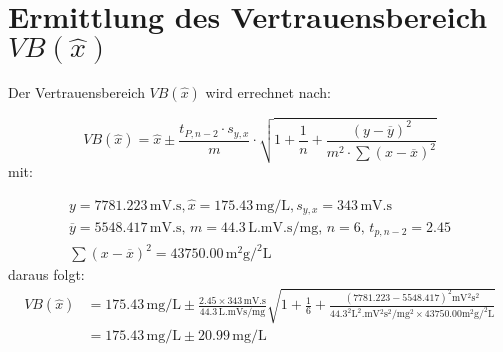 \documentclass{article}
\begin{document}
\section{Ermittlung des Vertrauensbereich $ VB(\hat{x}) $}
\begin{flushleft}
  Der Vertrauensbereich $VB(\hat{x})$ wird errechnet nach:
\end{flushleft}
\begin{equation}
  VB(\hat{x}) = \hat{x} \pm \frac{t_{P,n-2} \cdot s _{y,x}}{m} \cdot \sqrt{1+\frac{1}{n}+\frac{(y-\overline{y})^2}{m^2 \cdot \sum (x -\overline{x})^2}}
\end{equation}
mit:\par\noindent
\begin{align*}
   y =  \num{7781.223} \, \si{\milli\volt.\second} ,
   \hat{x}  = 175.43 \, \si{\milli\gram\per\liter} ,
   s_{y,x} = 343 \, \si{\milli\volt.\second} \\
    \overline{y} = \num{5548.417} \, \si{\milli\volt.\second} ,
   \, m = 44.3 \, \si{\liter.\milli\volt.\second\per\milli\gram},
    \, n = 6 ,
    \, t_{p,n-2}= 2.45 \\
   \sum (x -\overline{x})^2= \num{43750.00} \, \si{\square\milli\gram\square\per\liter}
 \end{align*}
 daraus folgt:
\begin{align*}
   VB(\hat{x}) &= 175.43 \, \si{\milli\gram\per\liter} \pm \frac{2.45 \times 343 \, \si{\milli\volt.\second}}{44.3 \, \si{\liter.\milli\volt\second\per\milli\gram}}
      \sqrt{1+\frac{1}{6}+\frac{(\num{7781.223}-\num{5548.417})^2 \si{\milli\volt^2\square\second}  }{44.3^2 \si{\square\liter.\milli\volt^2\square\second\per\milli\gram^2}
   \times \num{43750.00}  \si{\square\milli\gram\square\per\liter}}}\\
    &=175.43 \, \si{\milli\gram\per\liter} \pm 20.99  \, \si{\milli\gram\per\liter}
 \end{align*}


\end{document}
